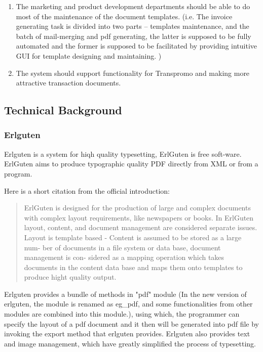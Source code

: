 \documentclass[12pt,twoside,a4paper]{report}
\begin{document}
\begin{enumerate}
\item The marketing and product development departments should be able to do most of the maintenance of the document templates. (i.e. The invoice generating task is divided into two parts -- templates maintenance, and the batch of mail-merging and pdf generating, the latter is supposed to be fully automated and the former is supposed to be facilitated by providing intuitive GUI for template designing and maintaining. )
\item The system should support functionality for Transpromo and making more attractive transaction documents.
\end{enumerate}

\subsection{Technical Background}
\subsubsection{Erlguten}
  Erlguten is a system for hiqh quality typesetting, ErlGuten is free soft-ware. ErlGuten aims to produce typographic quality PDF directly from XML or from a program.\cite{erlguten03}
 
  Here is a short citation from the official introduction:

\begin{quote}
  ErlGuten is designed for the production of large and complex documents
with complex layout requirements, like newspapers or books. In ErlGuten
layout, content, and document management are considered separate issues.
Layout is template based - Content is assumed to be stored as a large num-
ber of documents in a file system or data base, document management is con-
sidered as a mapping operation which takes documents in the content data
base and maps them onto templates to produce hight quality output.\cite{erlguten03} 
\end{quote}

  Erlguten provides a bundle of methods in "pdf" module (In the new version of erlguten, the module is renamed as eg\_pdf, and some functionalities from other modules are combined into this module.), using which, the programmer can specify the layout of a pdf document and it then will be generated into pdf file by invoking the export method that erlguten provides. Erlguten also provides text and image management, which have greatly simplified the process of typesetting. 
\end{document}

